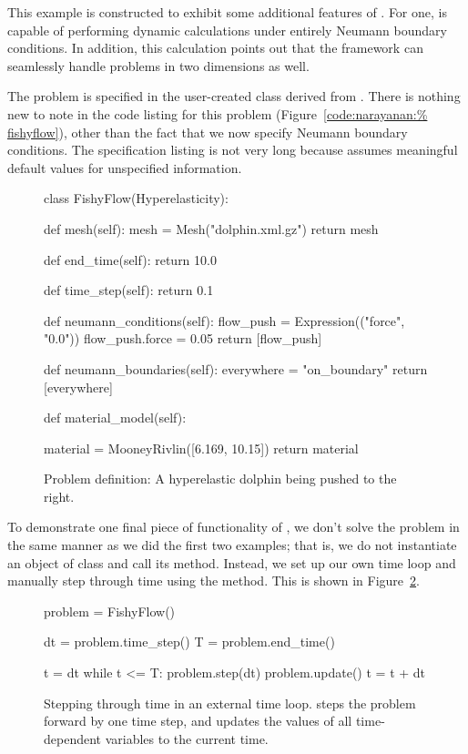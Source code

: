 This example is constructed to exhibit some additional features of
\twist. For one, \twist{} is capable of performing dynamic calculations
under entirely Neumann boundary conditions. In addition, this
calculation points out that the framework can seamlessly handle
problems in two dimensions as well.

The problem is specified in the user-created class 
derived from . There is nothing new to note in
the code listing for this problem (Figure~\ref{code:narayanan:%
fishyflow}), other than the fact that we now specify Neumann boundary
conditions. The specification listing is not very long because
\twist{} assumes meaningful default values for unspecified
information.

\begin{figure}[ht]
\begin{python}
class FishyFlow(Hyperelasticity):

    def mesh(self):
        mesh = Mesh("dolphin.xml.gz")
        return mesh

    def end_time(self):
        return 10.0

    def time_step(self):
        return 0.1

    def neumann_conditions(self):
        flow_push = Expression(("force", "0.0"))
        flow_push.force = 0.05
        return [flow_push]

    def neumann_boundaries(self):
        everywhere = "on_boundary"
        return [everywhere]

    def material_model(self):

        material = MooneyRivlin([6.169, 10.15])
        return material
\end{python}
\caption{Problem definition: A hyperelastic dolphin being pushed to
  the right.}
\label{code:narayanan:fishyflow}
\end{figure}

To demonstrate one final piece of functionality of \twist, we don't
solve the problem in the same manner as we did the first two examples;
that is, we do not instantiate an object of class  and
call its  method. Instead, we set up our own time loop
and manually step through time using the  method. This is
shown in Figure~\ref{code:narayanan:manualstep}.

\begin{figure}[ht]
\begin{python}
problem = FishyFlow()

dt = problem.time_step()
T = problem.end_time()

t = dt
while t <= T:
    problem.step(dt)
    problem.update()
    t = t + dt
\end{python}
\caption{Stepping through time in an external time loop. 
  steps the problem forward by one time step, and 
  updates the values of all time-dependent variables to the current time.}
\label{code:narayanan:manualstep}
\end{figure}

